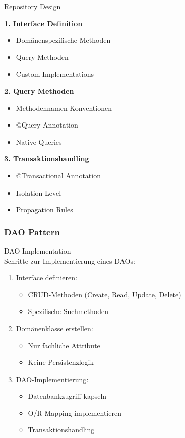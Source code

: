 \begin{KR}{Repository Design}

\begin{minipage}[t]{0.5\textwidth}
\textbf{1. Interface Definition}
\begin{itemize}
    \item Domänenspezifische Methoden
    \item Query-Methoden
    \item Custom Implementations
\end{itemize}

\textbf{2. Query Methoden}
\begin{itemize}
    \item Methodennamen-Konventionen
    \item @Query Annotation
    \item Native Queries
\end{itemize}
\end{minipage}
\begin{minipage}[t]{0.5\textwidth}
\textbf{3. Transaktionshandling}
\begin{itemize}
    \item @Transactional Annotation
    \item Isolation Level
    \item Propagation Rules
\end{itemize}
\end{minipage}
\end{KR}

\subsubsection{DAO Pattern}

\begin{KR}{DAO Implementation}\\
Schritte zur Implementierung eines DAOs:
\begin{enumerate}
    \item Interface definieren:
    \begin{itemize}
        \item CRUD-Methoden (Create, Read, Update, Delete)
        \item Spezifische Suchmethoden
    \end{itemize}
    \item Domänenklasse erstellen:
    \begin{itemize}
        \item Nur fachliche Attribute
        \item Keine Persistenzlogik
    \end{itemize}
    \item DAO-Implementierung:
    \begin{itemize}
        \item Datenbankzugriff kapseln
        \item O/R-Mapping implementieren
        \item Transaktionshandling
    \end{itemize}
\end{enumerate}
\end{KR}



